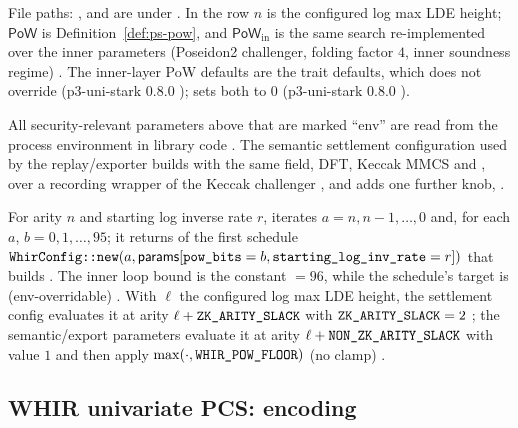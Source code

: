 File paths: ,  and  are under
. In the  row $n$ is the configured log
max LDE height; $\mathsf{PoW}$ is Definition~\ref{def:ps-pow}, and
$\mathsf{PoW}_{\mathrm{in}}$ is the same search re-implemented over the inner
parameters (Poseidon2 challenger, folding factor $4$, inner soundness regime)
. The inner-layer PoW defaults are the
 trait defaults, which  does not
override (p3-uni-stark 0.8.0 ); 
sets both to $0$ (p3-uni-stark 0.8.0 ).

All security-relevant parameters above that are marked ``env'' are read from the
process environment in library code . The semantic settlement
configuration used by the replay/exporter builds  with the same
field, DFT, Keccak MMCS and , over a recording wrapper of the
Keccak challenger , and
adds one further knob,  .

\begin{definition}
\label{def:ps-pow}
For arity $n$ and starting log inverse rate $r$,
 iterates $a = n, n-1, \dots, 0$ and, for each
$a$, $b = 0, 1, \dots, 95$; it returns  of the first
schedule $\texttt{WhirConfig::new}(a, \mathsf{params}[\texttt{pow\_bits}=b,
\texttt{starting\_log\_inv\_rate}=r])$ that builds
. The inner loop bound is the constant
 $=96$, while the schedule's target is
 (env-overridable)
. With $\ell$ the configured log max LDE height, the
settlement config evaluates it at arity $\ell + \texttt{ZK\_ARITY\_SLACK}$ with
$\texttt{ZK\_ARITY\_SLACK}=2$ ; the semantic/export
parameters evaluate it at arity $\ell + \texttt{NON\_ZK\_ARITY\_SLACK}$ with value $1$
and then apply $\max(\cdot,\texttt{WHIR\_POW\_FLOOR})$ (no clamp)
.
\end{definition}

\subsection{WHIR univariate PCS: encoding}
\label{subsec:ps-encoding}

